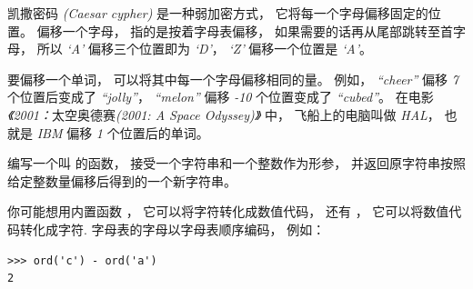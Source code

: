 \begin{exercise}
  

\label{exrotate}

凯撒密码 {\em (Caesar cypher)} 是一种弱加密方式， 它将每一个字母偏移固定的位置。  偏移一个字母， 指的是按着字母表偏移， 如果需要的话再从尾部跳转至首字母， 所以 {\em `A'} 偏移三个位置即为 {\em `D'}， {\em `Z'} 偏移一个位置是 {\em `A'}。


要偏移一个单词， 可以将其中每一个字母偏移相同的量。  例如， {\em ``cheer''} 偏移 {\em 7} 个位置后变成了 {\em ``jolly''}， {\em ``melon''} 偏移 {\em -10} 个位置变成了 {\em ``cubed''}。  在电影 {\em 《2001：}太空奥德赛{\em (2001: A Space Odyssey)》} 中， 飞船上的电脑叫做 {\em HAL}， 也就是 {\em IBM} 偏移 {\em 1} 个位置后的单词。



编写一个叫 {\em {}} 的函数， 接受一个字符串和一个整数作为形参， 并返回原字符串按照给定整数量偏移后得到的一个新字符串。


你可能想用内置函数 {\em {}} ， 它可以将字符转化成数值代码， 还有 {\em {}}， 它可以将数值代码转化成字符. 字母表的字母以字母表顺序编码， 例如：

\begin{em}
\begin{lstlisting}
>>> ord('c') - ord('a')
2
\end{lstlisting}
\end{em}


\end{exercise}
